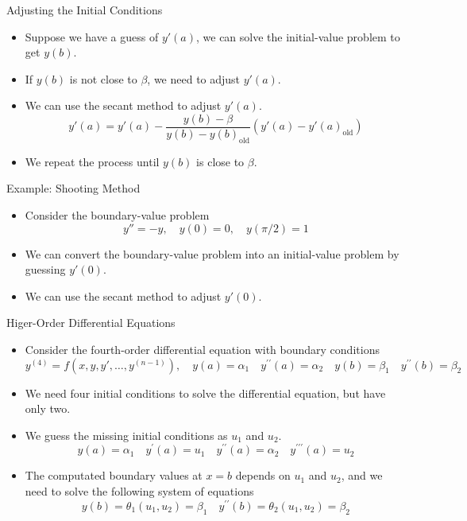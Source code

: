 \documentclass{beamer}
\begin{document}
\begin{frame}{Adjusting the Initial Conditions}
    \begin{itemize}
        \item Suppose we have a guess of $y'(a)$, we can solve the initial-value problem to get $y(b)$.
        \item If $y(b)$ is not close to $\beta$, we need to adjust $y'(a)$.
        \item We can use the secant method to adjust $y'(a)$.
        \[
        y'(a) = y'(a) - \frac{y(b) - \beta}{y(b) - y(b)_{\textrm{old}}} (y'(a) - y'(a)_{\textrm{old}})
        \]
        \item We repeat the process until $y(b)$ is close to $\beta$.
    \end{itemize}
\end{frame}
\begin{frame}{Example: Shooting Method}
    \begin{itemize}
        \item Consider the boundary-value problem
        \[
        y'' = -y, \quad y(0) = 0, \quad y(\pi/2) = 1
        \]
        \item We can convert the boundary-value problem into an initial-value problem by guessing $y'(0)$.
        \item We can use the secant method to adjust $y'(0)$.
    \end{itemize}

\end{frame}
\begin{frame}{Higer-Order Differential Equations}
    \begin{itemize}
        \item Consider the fourth-order differential equation with boundary conditions
        \[
        y^{(4)} = f(x, y, y', \ldots, y^{(n-1)}), \quad y(a)=\alpha_1 \quad y^{\prime \prime}(a)=\alpha_2
         \quad y(b)=\beta_1 \quad y^{\prime \prime}(b)=\beta_2 
        \]
        \item We need four initial conditions to solve the differential equation, but have only two.
        \item We guess the missing initial conditions as $u_1$ and $u_2$.
        \[
            y(a)=\alpha_1 \quad y^{\prime}(a)=u_1 \quad y^{\prime \prime}(a)=\alpha_2 \quad y^{\prime \prime \prime}(a)=u_2
        \]
        \item The computated boundary values at $x=b$ depends on $u_1$ and $u_2$, and we need to solve the following system of equations
        \[
            y(b)=\theta_1\left(u_1, u_2\right)=\beta_1 \quad y^{\prime \prime}(b)=\theta_2\left(u_1, u_2\right)=\beta_2
        \]
    \end{itemize}
\end{frame}
\end{document}
